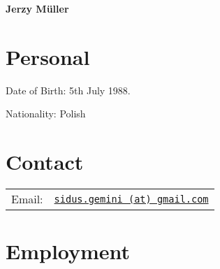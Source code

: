 \documentclass[a4paper,pdftex]{article}
\def\name{Jerzy Müller}
\renewenvironment{itemize}{
  \begin{list}{}{
    \setlength{\leftmargin}{1.5em}
  }
}{
  \end{list}
}
\begin{document}
{\huge \bf \name}


\vspace{0.1in}

\section*{Personal}

\begin{itemize}
 \item Date of Birth: 5th July 1988.
 \item Nationality: Polish
\end{itemize}

\section*{Contact}

\begin{itemize}
 \item
  \begin{tabular}{p{}p{}}
  Email:	& \href{mailto:sidus.gemini@gmail.com}{\tt sidus.gemini (at) gmail.com}
  \end{tabular}
\end{itemize}

\section*{Employment}
\end{document}
